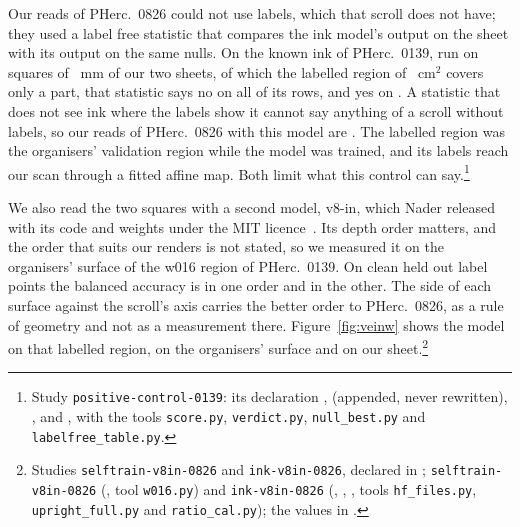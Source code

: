 Our reads of PHerc.~0826 could not use labels, which that scroll does not have; they used a label free statistic that
compares the ink model's output on the sheet with its output on the same nulls. On the known ink of PHerc.~0139, run on
squares of \PcLabelFreeSquare{}~mm of our two sheets, of which the labelled region of \PcRegion{}~cm$^2$ covers only a part,
that statistic says no on all \PcLabelFreeRows{} of its rows, and
yes on \PcLabelFreeYes{}. A statistic that does not see ink where the labels show it cannot say anything of a scroll
without labels, so our reads of PHerc.~0826 with this model are \PcInkReading{}. The labelled
region was the organisers' validation region while the model was trained, and its labels reach our scan through a
fitted affine map. Both limit what this control can say.\footnote{Study \texttt{positive-control-0139}: its declaration ,
 (appended, never rewritten), ,  and ,
with the tools \texttt{score.py}, \texttt{verdict.py}, \texttt{null\_best.py} and \texttt{labelfree\_table.py}.}

We also read the two squares with a second model, v8-in, which Nader released with its code and weights under the MIT
licence~\cite{v8in}. Its depth order matters, and the order that suits our renders is not stated, so we measured it on the
organisers' surface of the w016 region of PHerc.~0139. On \VeinOrderPixels{} clean held out label points the balanced
accuracy is \VeinOrderBa{} in one order and \VeinOrderBaOther{} in the other. The side of each surface against the
scroll's axis carries the better order to PHerc.~0826, as a rule of geometry and not as a measurement there.
Figure~\ref{fig:veinw} shows the model on that labelled region, on the organisers' surface and on our sheet.\footnote{Studies
\texttt{selftrain-v8in-0826} and \texttt{ink-v8in-0826}, declared in ; \texttt{selftrain-v8in-0826} (, tool \texttt{w016.py}) and \texttt{ink-v8in-0826}
(, , , tools \texttt{hf\_files.py},
\texttt{upright\_full.py} and \texttt{ratio\_cal.py}); the values in .}

